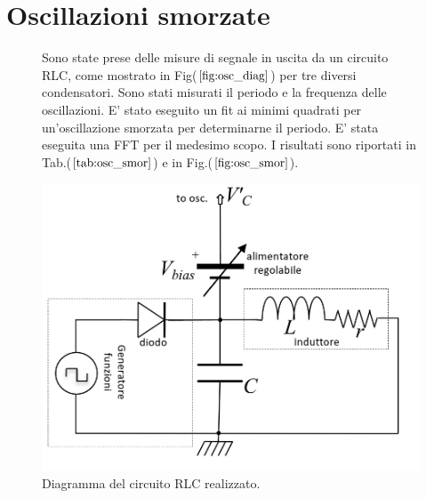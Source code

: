 \documentclass{article}
\begin{document}
\section{Oscillazioni smorzate}

        
        \begin{figure}[H]
            \begin{minipage}{0.45\textwidth}
                Sono state prese delle misure di segnale in uscita da un circuito RLC,
                come mostrato in Fig($\ref{fig:osc_diag}$) per tre diversi condensatori.
                Sono stati misurati il periodo e la frequenza delle oscillazioni.
                E' stato eseguito un fit ai minimi quadrati per un'oscillazione 
                smorzata per determinarne il periodo.
                E' stata eseguita una FFT per il medesimo scopo.
                I risultati sono riportati in Tab.($\ref{tab:osc_smor}$) e 
                in Fig.($\ref{fig:osc_smor}$).
            \end{minipage}%
            \hfill
            \begin{minipage}{0.45\textwidth}
                \includegraphics[width=\textwidth]{FFT12/RLCdiagram.png}
                \caption{Diagramma del circuito RLC realizzato.}
                \label{fig:osc_diag}
            \end{minipage}
        \end{figure}
\end{document}
